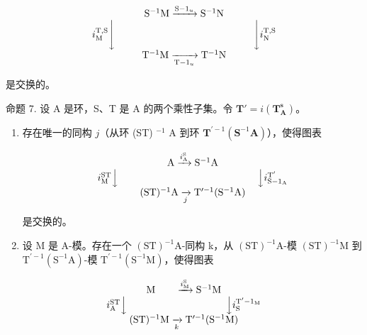 \[
\begin{array}{c} \mathrm{S} ^ {- 1} \mathrm{M} \xrightarrow {\mathrm{S} - 1 _ {u}} \mathrm{S} ^ {- 1} \mathrm{N} \\ i _ {\mathrm{M}} ^ {\mathrm{T}, \mathrm{S}} \Biggl \downarrow \qquad \qquad \qquad \qquad \qquad \qquad \qquad \Biggl \downarrow i _ {\mathrm{N}} ^ {\mathrm{T}, \mathrm{S}} \\ \mathrm{T} ^ {- 1} \mathrm{M} \xrightarrow [ \mathrm{T} - 1 _ {u} ]{} \mathrm{T} ^ {- 1} \mathrm{N} \end{array}
\]

是交换的。

命题 7. 设 A 是环，S、T 是 A 的两个乘性子集。令 \(\mathbf{T}' = i(\mathbf{T}_{\mathbf{A}}^{\mathbf{s}})\)。

\begin{enumerate}
\def\labelenumi{(\roman{enumi})}
\tightlist
\item
  存在唯一的同构 \(j\)（从环 (ST) \(^{-1}\) A 到环 \(\mathbf{T}^{\prime -1}(\mathbf{S}^{-1}\mathbf{A})\)），使得图表

\[
\begin{array}{c} \mathrm{A} \xrightarrow {i _ {\mathrm{A}} ^ {\mathrm{S}}} \mathrm{S} ^ {- 1} \mathrm{A} \\ i _ {\mathrm{M}} ^ {\mathrm{ST}} \Big \downarrow \qquad \qquad \qquad \qquad \qquad \qquad \qquad \Big \downarrow i _ {\mathrm{S} - 1 _ {\mathrm{A}}} ^ {\mathrm{T} ^ {\prime}} \\ (\mathrm{ST}) ^ {- 1} \mathrm{A} \xrightarrow [ j ]{} \mathrm{T} ^ {\prime - 1} (\mathrm{S} ^ {- 1} \mathrm{A}) \end{array}
\]

是交换的。

\item
  设 M 是 A-模。存在一个 \((\mathrm{ST})^{-1}\mathrm{A}\)-同构 k，从 \((\mathrm{ST})^{-1}\mathrm{A}\)-模 \((\mathrm{ST})^{-1}\mathrm{M}\) 到 \(\mathrm{T}^{\prime-1}(\mathrm{S}^{-1}\mathrm{A})\)-模 \(\mathrm{T}^{\prime-1}(\mathrm{S}^{-1}\mathrm{M})\)，使得图表
\end{enumerate}

\[
\begin{array}{c} \mathrm{M} \qquad \xrightarrow {i _ {\mathrm{M}} ^ {\mathrm{S}}} \mathrm{S} ^ {- 1} \mathrm{M} \\ i _ {\mathrm{A}} ^ {\mathrm{ST}} \Big \downarrow \qquad \qquad \qquad \qquad \qquad \Big \downarrow i _ {\mathrm{S}} ^ {\mathrm{T} ^ {\prime} - 1 _ {\mathrm{M}}} \\ (\mathrm{ST}) ^ {- 1} \mathrm{M} \xrightarrow [ k ]{} \mathrm{T} ^ {\prime - 1} (\mathrm{S} ^ {- 1} \mathrm{M}) \end{array}
\]

